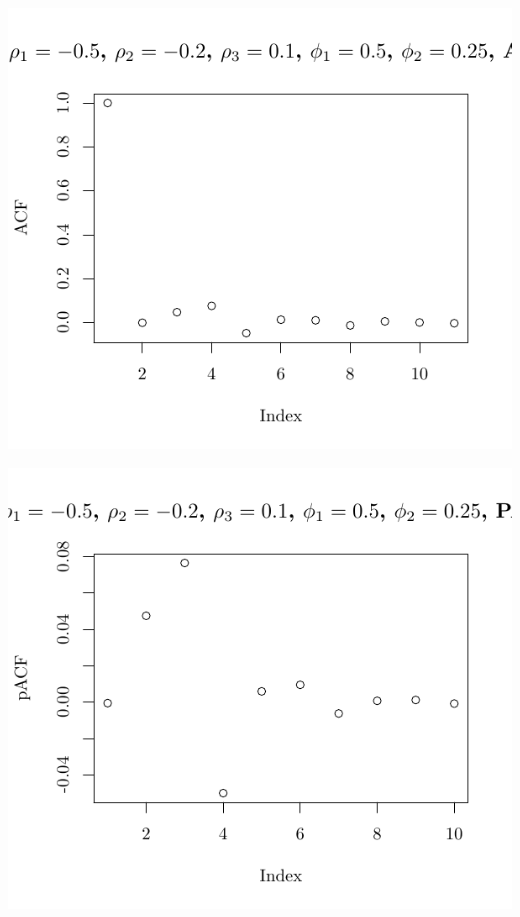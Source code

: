 \documentclass[10pt]{paper}\usepackage[]{graphicx}\usepackage[]{color}
\makeatletter
\def\maxwidth{ %
  \ifdim\Gin@nat@width>\linewidth
    \linewidth
  \else
    \Gin@nat@width
  \fi
}
\newenvironment{knitrout}{}{} %
\makeatother
\begin{document}
\begin{knitrout}
{\centering \includegraphics[width=\maxwidth]{figure/graphics-plotter-159} 

}




{\centering \includegraphics[width=\maxwidth]{figure/graphics-plotter-160} 

}





\end{knitrout}
\end{document}
